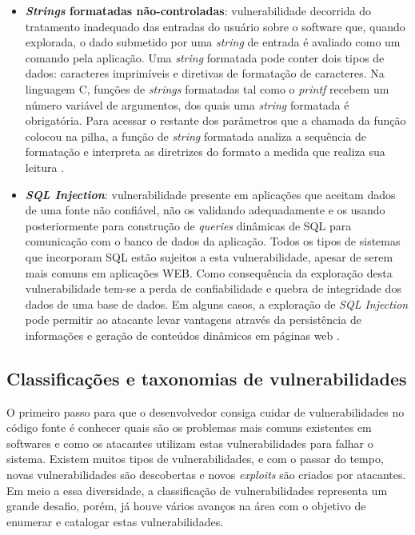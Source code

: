 \begin{itemize}
\item \textbf{\emph{Strings} formatadas não-controladas}: vulnerabilidade decorrida do tratamento inadequado das entradas do usuário sobre o software que, quando explorada, o dado submetido por uma \emph{string} de entrada é avaliado como um comando pela aplicação. Uma \emph{string} formatada pode conter dois tipos de dados: caracteres imprimíveis e diretivas de formatação de caracteres. Na linguagem C, funções de \emph{strings} formatadas tal como o \emph{printf} recebem um número variável de argumentos, dos quais uma \emph{string}  formatada é obrigatória. Para acessar o restante dos parâmetros que a chamada da função colocou na pilha, a função de \emph{string} formatada analiza a sequência de formatação e interpreta as diretrizes do formato a medida que realiza sua leitura \cite{lhee2002}.

\item \textbf{\emph{SQL Injection}}: vulnerabilidade presente em aplicações que aceitam dados de uma fonte não confiável, não os validando adequadamente e os usando posteriormente para construção de \emph{queries} dinâmicas de SQL para comunicação com o banco de dados da aplicação. Todos os tipos de sistemas que incorporam SQL estão sujeitos a esta vulnerabilidade, apesar de serem mais comuns em aplicações WEB. Como consequência da exploração desta vulnerabilidade tem-se a perda de confiabilidade e quebra de integridade dos dados de uma base de dados. Em alguns casos, a exploração de \emph{SQL Injection} pode permitir ao atacante levar vantagens através da persistência de informações e geração de conteúdos dinâmicos em páginas web \cite{uscert2012}.
\end{itemize}


\subsection{Classificações e taxonomias de vulnerabilidades}
\label{subsec-vulnerabilities-taxonomy}
%

O primeiro passo para que o desenvolvedor consiga cuidar de vulnerabilidades no código fonte é conhecer quais são os problemas mais comuns existentes em softwares e como os atacantes utilizam estas vulnerabilidades para falhar o sistema. Existem muitos tipos de vulnerabilidades, e com o passar do tempo, novas vulnerabilidades são descobertas e novos \emph{exploits} são criados por atacantes. Em meio a essa diversidade, a classificação de vulnerabilidades representa um grande desafio, porém, já houve vários avanços na área com o objetivo de enumerar e catalogar estas vulnerabilidades.

